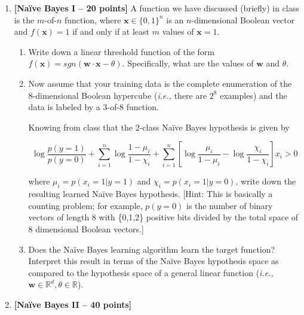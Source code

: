 \documentclass[12pt,letterpaper]{article}
\begin{document}
\begin{enumerate}

\item
{\bf [Na\"{i}ve Bayes I -- 20 points]} A function we have discussed (briefly) in class is the $m$-of-$n$ function, where $\mathbf{x} \in \{0,1\}^n$ is an $n$-dimensional Boolean vector and $f(\mathbf{x}) = 1$ if and only if at least $m$ values of $\mathbf{x} = 1$.

\begin{enumerate}
\item
Write down a linear threshold function of the form $f(\mathbf{x}) = sgn(\mathbf{w} \cdot \mathbf{x} - \theta)$.  Specifically, what are the values of $\mathbf{w}$ and $\theta$.
\item
Now assume that your training data is the complete enumeration of the 8-dimensional Boolean hypercube ({\em i.e.,} there are $2^8$ examples) and the data is labeled by a 3-of-8 function.

Knowing from class that the 2-class Na\"{i}ve Bayes hypothesis is given by 

$$\log \frac{p(y = 1)}{p(y = 0)} + \sum_{i=1}^n \log \frac{1 - \mu_i}{1 - \chi_i} + \sum_{i=1}^n \left[ \log \frac{\mu_i}{1 - \mu_i} - \log \frac{\chi_i}{1 - \chi_i} \right] x_i > 0$$

where $\mu_i = p(x_i = 1 | y = 1)$ and $\chi_i = p(x_i = 1 | y = 0)$, write down the resulting learned Na\"{i}ve Bayes hypothesis.  [Hint: This is basically a counting problem; for example, $p(y=0)$ is the number of binary vectors of length 8 with \{0,1,2\} positive bits divided by the total space of 8 dimensional Boolean vectors.]

\item
Does the Na\"{i}ve Bayes learning algorithm learn the target function?  Interpret this result in terms of the Na\"{i}ve Bayes hypothesis space as compared to the hypothesis space of a general linear function ({\em i.e.,} $\mathbf{w} \in \mathbb{R}^d, \theta \in \mathbb{R}$).
\end{enumerate}

\clearpage
\item
{\bf [Na\"{i}ve Bayes II -- 40 points]}


\end{enumerate}
\end{document}
